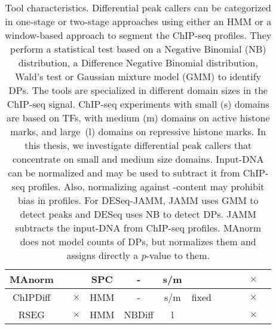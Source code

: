 \begin{table}[ht]
\begin{center}
\begin{tabular}{c|c|c|c|c|c|c|c|c|c|c|c}
 MAnorm 	& 		&  		& SPC 		& -		& s/m & 		& 		& 		& 		& $\times$ 	& 		\\\hline
 ChIPDiff	& 		&  $\times$	& HMM 		& -		& s/m & fixed		& 		& 		& 		& $\times$ 	& 		\\\hline
 RSEG 		& 		& $\times$ 	& HMM		& NBDiff 	& l & 		& 		&  		& 		& $\times$ 	& 	 	\\
 \end{tabular}
 \caption[Tool characteristics]{Tool characteristics. 
 Differential peak callers can be categorized in one-stage or two-stage approaches using either an HMM or a window-based approach to segment the ChIP-seq profiles.
 They perform a statistical test based on a Negative Binomial (NB) distribution, a Difference Negative Binomial distribution, Wald's test or Gaussian mixture model (GMM) to identify DPs.
 The tools are specialized in different domain sizes in the ChIP-seq signal. 
 ChIP-seq experiments with small (s) domains are based on TFs, with medium (m) domains on active histone marks, and large~(l) domains on repressive histone marks.
 In this thesis, we investigate differential peak callers that concentrate on small and medium size domains.
 Input-DNA can be normalized and may be used to subtract it from ChIP-seq profiles.
 Also, normalizing against -content may prohibit bias in profiles.
 For DESeq-JAMM, JAMM uses GMM to detect peaks and DESeq uses NB to detect DPs. 
 JAMM subtracts the input-DNA from ChIP-seq profiles.
 MAnorm does not model counts of DPs, but normalizes them and assigns directly a $p$-value to them.
}
 \label{tab_tools}
\end{center}
\end{table}





